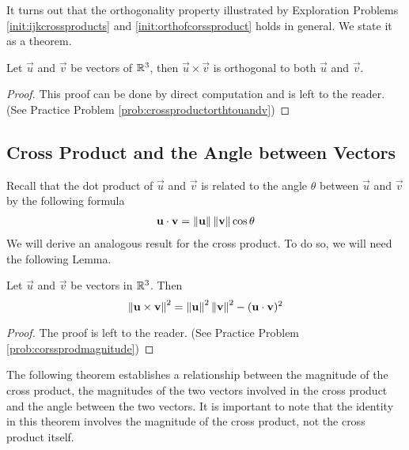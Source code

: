 \documentclass{ximera}
\begin{document}
It turns out that the orthogonality property illustrated by Exploration Problems \ref{init:ijkcrossproducts} and \ref{init:orthofcorssproduct}  holds in general.  We state it as a theorem.

\begin{theorem}\label{th:crossproductorthtouandv}
Let $\vec{u}$ and $\vec{v}$ be vectors of $\mathbb{R}^3$, then $\vec{u}\times\vec{v}$ is orthogonal to both $\vec{u}$ and $\vec{v}$.
\end{theorem}
\begin{proof}This proof can be done by direct computation and is left to the reader.  (See Practice Problem \ref{prob:crossproductorthtouandv})
\end{proof}

\subsection*{Cross Product and the Angle between Vectors}
Recall that the dot product of $\vec{u}$ and $\vec{v}$ is related to the angle $\theta$ between $\vec{u}$ and $\vec{v}$ by the following formula
\begin{align}\label{eq:dotproductformula}\mathbf{u}\cdot\mathbf{v}=\left\lVert\mathbf{u}\right\rVert\left\lVert\mathbf{v}\right\rVert\cos\theta\end{align}
We will derive an analogous result for the cross product.  To do so, we will need the following Lemma.

\begin{lemma}\label{lemma:crossprodmagnitude}
Let $\vec{u}$ and $\vec{v}$ be vectors in $\mathbb{R}^3$.  Then
$$\left\lVert\mathbf{u}\times\mathbf{v}\right\rVert^2=\left\lVert\mathbf{u}\right\rVert^2\left\lVert\mathbf{v}\right\rVert^2-(\mathbf{u}\cdot\mathbf{v})^2$$
\end{lemma}
\begin{proof} The proof is left to the reader.  (See Practice Problem \ref{prob:corssprodmagnitude})
\end{proof}

The following theorem establishes a relationship between the magnitude of the cross product, the magnitudes of the two vectors involved in the cross product and the angle between the two vectors.  It is important to note that  the identity in this theorem involves the magnitude of the cross product, not the cross product itself.
\end{document}
